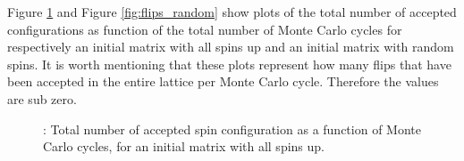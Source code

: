 \documentclass{article}
\begin{document}
{{		Figure \ref{fig:flips} and Figure \ref{fig:flips_random} show plots of the total number of accepted configurations as function of the total number of Monte Carlo cycles for respectively an initial matrix with all spins up and an initial matrix with random spins. It is worth mentioning that these plots represent how many flips that have been accepted in the entire lattice per Monte Carlo cycle. Therefore the values are sub zero.

		\begin{figure}[H]
		\caption{: Total number of accepted spin configuration as a function of Monte Carlo cycles, for an initial matrix with all spins up. }
		\label{fig:flips}
		\end{figure}

}}
\end{document}
